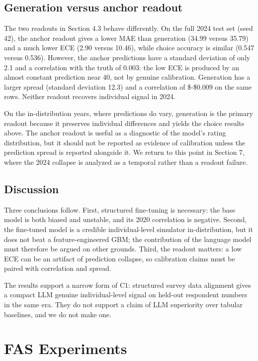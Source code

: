 \subsection{Generation versus anchor
readout}\label{generation-versus-anchor-readout}

The two readouts in Section 4.3 behave differently. On the full 2024
test set (seed 42), the anchor readout gives a lower MAE than generation
(34.99 versus 35.79) and a much lower ECE (2.90 versus 10.46), while
choice accuracy is similar (0.547 versus 0.536). However, the anchor
predictions have a standard deviation of only 2.1 and a correlation with
the truth of 0.003: the low ECE is produced by an almost constant
prediction near 40, not by genuine calibration. Generation has a larger
spread (standard deviation 12.3) and a correlation of \$-\$0.009 on the
same rows. Neither readout recovers individual signal in 2024.

On the in-distribution years, where predictions do vary, generation is
the primary readout because it preserves individual differences and
yields the choice results above. The anchor readout is useful as a
diagnostic of the model's rating distribution, but it should not be
reported as evidence of calibration unless the prediction spread is
reported alongside it. We return to this point in Section 7, where the
2024 collapse is analyzed as a temporal rather than a readout failure.

\subsection{Discussion}\label{discussion}

Three conclusions follow. First, structured fine-tuning is necessary:
the base model is both biased and unstable, and its 2020 correlation is
negative. Second, the fine-tuned model is a credible individual-level
simulator in-distribution, but it does not beat a feature-engineered
GBM; the contribution of the language model must therefore be argued on
other grounds. Third, the readout matters: a low ECE can be an artifact
of prediction collapse, so calibration claims must be paired with
correlation and spread.

The results support a narrow form of C1: structured survey data
alignment gives a compact LLM genuine individual-level signal on
held-out respondent numbers in the same era. They do not support a claim
of LLM superiority over tabular baselines, and we do not make one.

\section{FAS Experiments}\label{fas-experiments}

